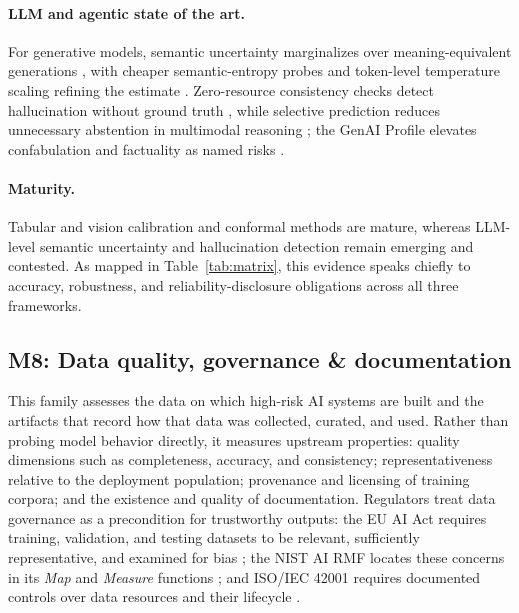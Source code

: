 \paragraph{LLM and agentic state of the art.} For generative models, semantic uncertainty marginalizes over meaning-equivalent generations \cite{kuhn2023semantic}, with cheaper semantic-entropy probes \cite{kossen2024semantic} and token-level temperature scaling refining the estimate \cite{lamb2026temperature}. Zero-resource consistency checks detect hallucination without ground truth \cite{manakul2023selfcheckgpt}, while selective prediction reduces unnecessary abstention in multimodal reasoning \cite{srinivasan2024selective}; the GenAI Profile elevates confabulation and factuality as named risks \cite{nist2024genai}.

\paragraph{Maturity.} Tabular and vision calibration and conformal methods are mature, whereas LLM-level semantic uncertainty and hallucination detection remain emerging and contested. As mapped in Table~\ref{tab:matrix}, this evidence speaks chiefly to accuracy, robustness, and reliability-disclosure obligations across all three frameworks.

\subsection{M8: Data quality, governance \& documentation}
\label{subsec:m8}

This family assesses the data on which high-risk AI systems are built and the artifacts that record how that data was collected, curated, and used. Rather than probing model behavior directly, it measures upstream properties: quality dimensions such as completeness, accuracy, and consistency; representativeness relative to the deployment population; provenance and licensing of training corpora; and the existence and quality of documentation. Regulators treat data governance as a precondition for trustworthy outputs: the EU AI Act requires training, validation, and testing datasets to be relevant, sufficiently representative, and examined for bias \cite{euaiact2024}; the NIST AI RMF locates these concerns in its \textit{Map} and \textit{Measure} functions \cite{nist2023airmf}; and ISO/IEC 42001 requires documented controls over data resources and their lifecycle \cite{iso42001}.

